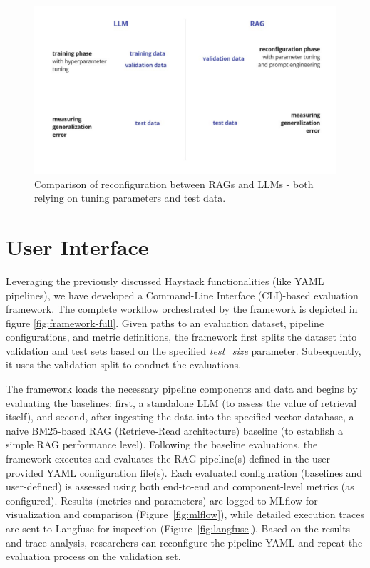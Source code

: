 \begin{figure}[!ht] 
  \centering
  \includegraphics[width=\textwidth]{images/RAGvsLLM-tuning.pdf}
  \caption{Comparison of reconfiguration between RAGs and LLMs - both relying on tuning parameters and test data.}
  \label{fig:tuning}
\end{figure}

\section{User Interface}\label{sec:ui}

Leveraging the previously discussed Haystack functionalities (like YAML pipe\-lines), we have developed a Command-Line Interface (CLI)-based evaluation framework. The complete workflow orchestrated by the framework is depicted in figure \ref{fig:framework-full}. Given paths to an evaluation dataset, pipeline configurations, and metric definitions, the framework first splits the dataset into validation and test sets based on the specified \textit{test\_size} parameter. Subsequently, it uses the validation split to conduct the evaluations.

The framework loads the necessary pipeline components and data and begins by evaluating the baselines: first, a standalone LLM (to assess the value of retrieval itself), and second, after ingesting the data into the specified vector database, a naive BM25-based RAG (Retrieve-Read architecture) baseline (to establish a simple RAG performance level). Following the baseline evaluations, the framework executes and evaluates the RAG pipeline(s) defined in the user-provided YAML configuration file(s). Each evaluated configuration (baselines and user-defined) is assessed using both end-to-end and component-level metrics (as configured). Results (metrics and parameters) are logged to MLflow for visualization and comparison (Figure~\ref{fig:mlflow}), while detailed execution traces are sent to Langfuse for inspection (Figure~\ref{fig:langfuse}). Based on the results and trace analysis, researchers can reconfigure the pipeline YAML and repeat the evaluation process on the validation set.

